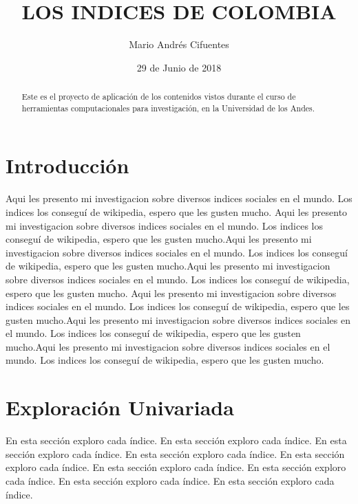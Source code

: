 \documentclass{article}
\title{LOS INDICES DE COLOMBIA}
\author[1]{\normalsize Mario Andrés Cifuentes}
\affil[1,2]{\small  Departamento Ingeniería Industrial,Universidad de los Andes\\
\texttt{{ma.cifuentes10}@uniandes.edu.co}}
\date{29 de Junio de 2018}
\begin{document}


\maketitle


\begin{abstract}
Este es el proyecto de aplicación de los contenidos vistos durante el curso de herramientas computacionales para investigación, en la Universidad de los Andes.
\end{abstract}

\section*{Introducción}

Aqui les presento mi investigacion sobre diversos indices sociales en el mundo. Los indices los conseguí de wikipedia, espero que les gusten mucho. Aqui les presento mi investigacion sobre diversos indices sociales en el mundo. Los indices los conseguí de wikipedia, espero que les gusten mucho.Aqui les presento mi investigacion sobre diversos indices sociales en el mundo. Los indices los conseguí de wikipedia, espero que les gusten mucho.Aqui les presento mi investigacion sobre diversos indices sociales en el mundo. Los indices los conseguí de wikipedia, espero que les gusten mucho.
Aqui les presento mi investigacion sobre diversos indices sociales en el mundo. Los indices los conseguí de wikipedia, espero que les gusten mucho.Aqui les presento mi investigacion sobre diversos indices sociales en el mundo. Los indices los conseguí de wikipedia, espero que les gusten mucho.Aqui les presento mi investigacion sobre diversos indices sociales en el mundo. Los indices los conseguí de wikipedia, espero que les gusten mucho.

\clearpage

\section{Exploración Univariada}\label{univariada}

En esta sección exploro cada índice. En esta sección exploro cada índice. En esta sección exploro cada índice. En esta sección exploro cada índice. En esta sección exploro cada índice. En esta sección exploro cada índice. En esta sección exploro cada índice. En esta sección exploro cada índice. En esta sección exploro cada índice.
\end{document}
